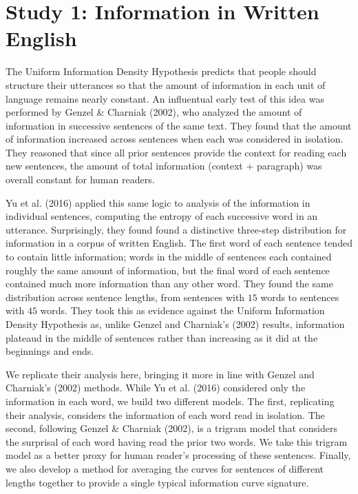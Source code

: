 \documentclass[10pt, letterpaper]{article}
\begin{document}
\hypertarget{study-1-information-in-written-english}{%
\section{Study 1: Information in Written
English}\label{study-1-information-in-written-english}}

The Uniform Information Density Hypothesis predicts that people should
structure their utterances so that the amount of information in each
unit of language remains nearly constant. An influentual early test of
this idea was performed by Genzel \& Charniak (2002), who analyzed the
amount of information in successive sentences of the same text. They
found that the amount of information increased across sentences when
each was considered in isolation. They reasoned that since all prior
sentences provide the context for reading each new sentences, the amount
of total information (context + paragraph) was overall constant for
human readers.

Yu et al. (2016) applied this same logic to analysis of the information
in individual sentences, computing the entropy of each successive word
in an utterance. Surprisingly, they found found a distinctive three-step
distribution for information in a corpus of written English. The first
word of each sentence tended to contain little information; words in the
middle of sentences each contained roughly the same amount of
information, but the final word of each sentence contained much more
information than any other word. They found the same distribution across
sentence lengths, from sentences with \(15\) words to sentences with
\(45\) words. They took this as evidence against the Uniform Information
Density Hypothesis as, unlike Genzel and Charniak's (2002) results,
information plateaud in the middle of sentences rather than increasing
as it did at the beginnings and ends.

We replicate their analysis here, bringing it more in line with Genzel
and Charniak's (2002) methods. While Yu et al. (2016) considered only
the information in each word, we build two different models. The first,
replicating their analysis, considers the information of each word read
in isolation. The second, following Genzel \& Charniak (2002), is a
trigram model that considers the surprisal of each word having read the
prior two words. We take this trigram model as a better proxy for human
reader's processing of these sentences. Finally, we also develop a
method for averaging the curves for sentences of different lengths
together to provide a single typical information curve signature.
\end{document}
